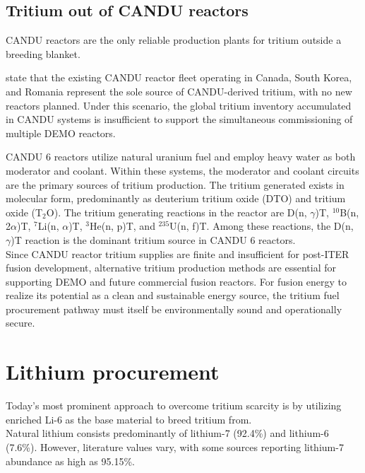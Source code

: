     \subsection{Tritium out of CANDU reactors} 
    \label{subsec_tritium_candu}
    CANDU reactors are the only reliable production plants for tritium outside a breeding blanket. \cite{wimmersNuclearPowerTechnology2026}

    \textcite{Pearson2018TritiumSupply} state that the existing CANDU reactor fleet operating in Canada, South Korea, and Romania represent the sole source of CANDU-derived tritium, with no new reactors planned. Under this scenario, the global tritium inventory accumulated in CANDU systems is insufficient to support the simultaneous commissioning of multiple DEMO reactors. \cite{Pearson2018TritiumSupply}

    CANDU 6 reactors utilize natural uranium fuel and employ heavy water as both moderator and coolant. Within these systems, the moderator and coolant circuits are the primary sources of tritium production. The tritium generated exists in molecular form, predominantly as deuterium tritium oxide (DTO) and tritium oxide (T$_2$O). %
    The tritium generating reactions in the reactor are D(n, $\gamma$)T, $^{10}$B(n, 2$\alpha$)T, $^7$Li(n, $\alpha$)T, $^3$He(n, p)T, and $^{235}$U(n, f)T. Among these reactions, the D(n, $\gamma$)T reaction is the dominant tritium source in CANDU 6 reactors. \cite{Kim1996TritiumpathwaysCANDU}\\

    Since CANDU reactor tritium supplies are finite and insufficient for post-ITER fusion development, alternative tritium production methods are essential for supporting DEMO and future commercial fusion reactors. For fusion energy to realize its potential as a clean and sustainable energy source, the tritium fuel procurement pathway must itself be environmentally sound and operationally secure.

\section{Lithium procurement} 
\label{sec_lithium_procurement}
Today's most prominent approach to overcome tritium scarcity is by utilizing enriched Li-6 as the base material to breed tritium from. \cite{wimmersNuclearPowerTechnology2026}\\
Natural lithium consists predominantly of lithium-7 (92.4\%) and lithium-6 (7.6\%). However, literature values vary, with some sources reporting lithium-7 abundance as high as 95.15\%. \cite{giegerich2019lithium6} \cite{BadeaLiIsotopes2023}



